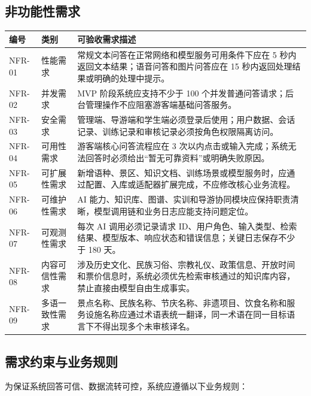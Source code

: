 \subsection{非功能性需求}

\begin{longtable}{p{1.6cm}p{2.6cm}p{9.2cm}}
\toprule
编号 & 类别 & 可验收需求描述 \\
\midrule
NFR-01 & 性能需求 & 常规文本问答在正常网络和模型服务可用条件下应在 5 秒内返回文本结果；语音问答和图片问答应在 15 秒内返回处理结果或明确的处理中提示。 \\
NFR-02 & 并发需求 & MVP 阶段系统应支持不少于 100 个并发普通问答请求；后台管理操作不应阻塞游客端基础问答服务。 \\
NFR-03 & 安全需求 & 管理端、导游端和学生端必须登录后使用；用户数据、会话记录、训练记录和审核记录必须按角色权限隔离访问。 \\
NFR-04 & 可用性需求 & 游客端核心问答流程应在 3 次以内点击或输入完成；系统无法回答时必须给出“暂无可靠资料”或明确失败原因。 \\
NFR-05 & 可扩展性需求 & 新增语种、景区、知识文档、训练场景或模型服务时，应通过配置、入库或适配器扩展完成，不应修改核心业务流程。 \\
NFR-06 & 可维护性需求 & AI 能力、知识库、图谱、实训和导游协同模块应保持职责清晰，模型调用链和业务日志应能支持问题定位。 \\
NFR-07 & 可观测性需求 & 每次 AI 调用必须记录请求 ID、用户角色、输入类型、检索结果、模型版本、响应状态和错误信息；关键日志保存不少于 180 天。 \\
NFR-08 & 内容可信性需求 & 涉及历史文化、民族习俗、宗教礼仪、政策信息、开放时间和票价信息时，系统必须优先检索审核通过的知识库内容，禁止直接由模型自由生成事实。 \\
NFR-09 & 多语一致性需求 & 景点名称、民族名称、节庆名称、非遗项目、饮食名称和服务设施名称应通过术语表统一翻译，同一术语在同一目标语言下不得出现多个未审核译名。 \\
\bottomrule
\end{longtable}

\subsection{需求约束与业务规则}

为保证系统回答可信、数据流转可控，系统应遵循以下业务规则：

